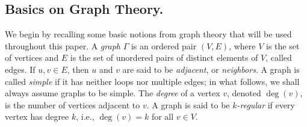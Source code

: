 \documentclass[11pt]{amsart}
\theoremstyle{plain}
\newtheorem{lemma}[theorem]{Lemma}
\begin{document}




 
\subsection*{Basics on Graph Theory.}

We begin by recalling some basic notions from graph theory that will be used throughout this paper. A \emph{graph} $\Gamma$ is an ordered pair $(V,E)$, where $V$ is the set of vertices and $E$ is the set of unordered pairs of distinct elements of $V$, called edges. If ${u,v} \in E$, then $u$ and $v$ are said to be \emph{adjacent}, or \emph{neighbors}. 
A graph is called \emph{simple} if it has neither loops nor multiple edges; in what follows, we shall always assume graphs to be simple. The \emph{degree} of a vertex $v$, denoted $\deg(v)$, is the number of vertices adjacent to $v$. A graph is said to be \emph{$k$-regular} if every vertex has degree $k$, i.e., $\deg(v)=k$ for all $v \in V$.
\end{document}
